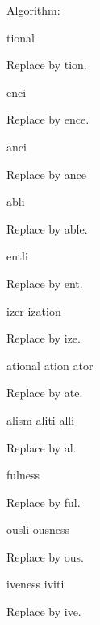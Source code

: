 \begin{DoxyParagraph}{Algorithm\+:}
\begin{DoxyItemize}
\begin{DoxyItemize}
\end{DoxyItemize}
\item tional
\begin{DoxyItemize}
\item Replace by tion.
\end{DoxyItemize}
\item enci
\begin{DoxyItemize}
\item Replace by ence.
\end{DoxyItemize}
\item anci
\begin{DoxyItemize}
\item Replace by ance
\end{DoxyItemize}
\item abli
\begin{DoxyItemize}
\item Replace by able.
\end{DoxyItemize}
\item entli
\begin{DoxyItemize}
\item Replace by ent.
\end{DoxyItemize}
\item izer ization
\begin{DoxyItemize}
\item Replace by ize.
\end{DoxyItemize}
\item ational ation ator
\begin{DoxyItemize}
\item Replace by ate.
\end{DoxyItemize}
\item alism aliti alli
\begin{DoxyItemize}
\item Replace by al.
\end{DoxyItemize}
\item fulness
\begin{DoxyItemize}
\item Replace by ful.
\end{DoxyItemize}
\item ousli ousness
\begin{DoxyItemize}
\item Replace by ous.
\end{DoxyItemize}
\item iveness iviti
\begin{DoxyItemize}
\item Replace by ive.

\end{DoxyItemize}
\end{DoxyItemize}
\end{DoxyParagraph}
